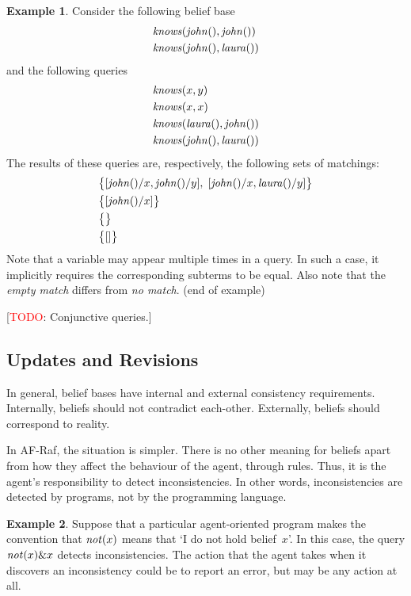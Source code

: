 \documentclass[a4paper,12pt,oneside,fleqn]{book} %
\theoremstyle{plain}
\theoremstyle{definition}
\newtheorem{example}{Example}
\theoremstyle{remark}
\newcommand{\eox}[1]{\hskip5mm\null\nobreak\hfill#1}
\newcommand{\eoe}{\eox{(end of example)}}
\newcommand{\todo}[1]{[\textcolor{red}{TODO}: #1]}
\begin{document}
\begin{example} Consider the following belief base \begin{align} &{\it
knows}({\it john}(), {\it john}()) \\ &{\it knows}({\it john}(), {\it
laura}()) \end{align} and the following queries \begin{align} &{\it
knows}(x, y) \\ &{\it knows}(x, x) \\ &{\it knows}({\it laura}(), {\it
john}()) \\ &{\it knows}({\it john}(), {\it laura}()) \end{align} The
results of these queries are, respectively, the following sets of
matchings: \begin{align} &\bigl\{ [{\it john}()/x, {\it john}()/y],\; [{\it
john}()/x,{\it laura}()/y] \bigr\} \\ &\bigl\{ [{\it john}()/x] \bigr\} \\
&\bigl\{\bigr\} \\ &\bigl\{[]\bigr\} \end{align} Note that a variable may
appear multiple times in a query.  In such a case, it implicitly requires
the corresponding subterms to be equal.  Also note that the \emph{empty
match} differs from \emph{no match}.  \eoe \end{example}

\todo{Conjunctive queries.}

\subsection{Updates and Revisions}

In general, belief bases have internal and external consistency
requirements.  Internally, beliefs should not contradict each-other.
Externally, beliefs should correspond to reality.

In AF-Raf, the situation is simpler.  There is no other meaning for beliefs
apart from how they affect the behaviour of the agent, through rules.
Thus, it is the agent's responsibility to detect inconsistencies.  In other
words, inconsistencies are detected by programs, not by the programming
language.

\begin{example} Suppose that a particular agent-oriented program makes the
convention that ${\it not}(x)$ means that `I do not hold belief~$x$'.  In
this case, the query ${\it not}(x)\&x$ detects inconsistencies.  The action
that the agent takes when it discovers an inconsistency could be to report
an error, but may be any action at all.  \end{example}
\end{document}
